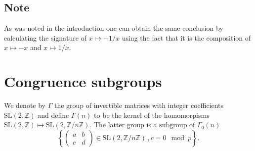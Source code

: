 \documentclass[12pt,a4paper]{amsart}
\def\HH{\mathbb{H}}
\def\gx{\Gamma(2)}
\def\xx{\HH/\Gamma(2)}
\def\ZZ{\mathbb{Z}}
\def\QQ{\mathbb{Q}}
\def\sl2{\mathrm{SL}(2, \ZZ)}
\def\sln{\mathrm{SL}(2, \ZZ/n\ZZ)}
\begin{document}
\subsection*{Note}
As was noted in the introduction one can obtain the same conclusion 
by calculating the signature of $x\mapsto -1/x$ 
using the fact that it is  the composition of
$x \mapsto -x$ and $x \mapsto 1/x$.








\section{Congruence subgroups}

We denote by  $\Gamma$ the  group of invertible matrices with integer coefficients  $\sl2$ 
and  define  $\Gamma(n)$ to be the 
kernel of the  homomorpisms $\sl2 \mapsto \sln$. 
The  latter group  is  a subgroup  of $\Gamma_0(n)$ 
$$ \left \{  \begin{pmatrix} a & b \\ c & d \end{pmatrix} \in \sln \, ,  c  =  0  \mod p \right \}. $$
\end{document}
